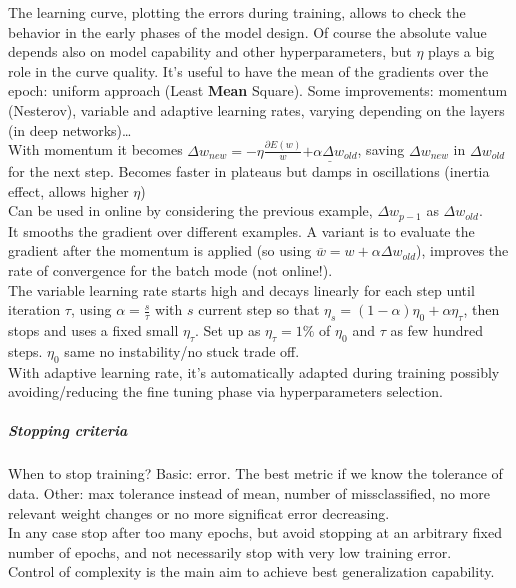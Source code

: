 \documentclass[10pt]{report}
\begin{document}
The learning curve, plotting the errors during training, allows to check the behavior in the early phases of the model design. Of course the absolute value depends also on model capability and other hyperparameters, but $\eta$ plays a big role in the curve quality. It's useful to have the mean of the gradients over the epoch: uniform approach (Least \textbf{Mean} Square). Some improvements: momentum (Nesterov), variable and adaptive learning rates, varying depending on the layers (in deep networks)\ldots\\
With momentum it becomes $\Delta w_{new} = -\eta\frac{\partial E(w)}{w} \underline{+ \alpha\Delta w_{old}}$, saving $\Delta w_{new}$ in $\Delta w_{old}$ for the next step. Becomes faster in plateaus but damps in oscillations (inertia effect, allows higher $\eta$)\\
Can be used in online by considering the previous example, $\Delta w_{p-1}$ as $\Delta w_{old}$.\\
It smooths the gradient over different examples. A variant is to evaluate the gradient after the momentum is applied (so using $\overline{w} = w + \alpha\Delta w_{old}$), improves the rate of convergence for the batch mode (not online!).\\
The variable learning rate starts high and decays linearly for each step until iteration $\tau$, using $\alpha = \frac{s}{\tau}$ with $s$ current step so that $\eta_s = (1-\alpha)\eta_0 + \alpha\eta_\tau$, then stops and uses a fixed small $\eta_\tau$. Set up as $\eta_\tau = 1\%$ of $\eta_0$ and $\tau$ as few hundred steps. $\eta_0$ same no instability/no stuck trade off.\\
With adaptive learning rate, it's automatically adapted during training possibly avoiding/reducing the fine tuning phase via hyperparameters selection.
\subparagraph{Stopping criteria} When to stop training? Basic: error. The best metric if we know the tolerance of data. Other: max tolerance instead of mean, number of missclassified, no more relevant weight changes or no more significat error decreasing.\\
In any case stop after too many epochs, but avoid stopping at an arbitrary fixed number of epochs, and not necessarily stop with very low training error.\\
Control of complexity is the main aim to achieve best generalization capability.
\end{document}

